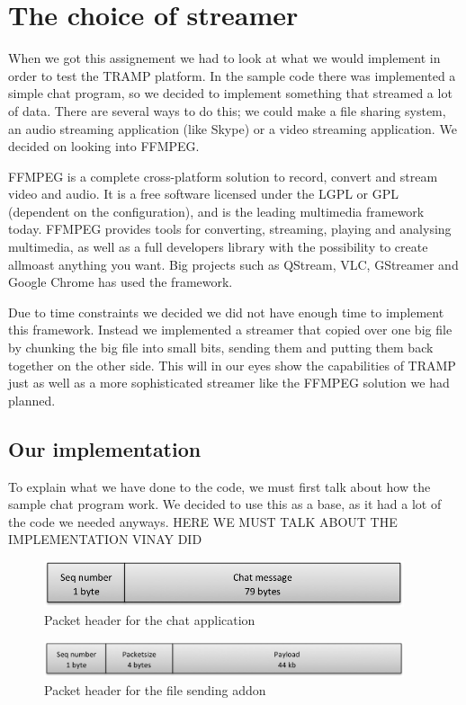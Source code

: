 
\section{The choice of streamer}
\label{sec:streamer}
When we got this assignement we had to look at what we would implement in order to test the TRAMP platform. In the sample code there was implemented a simple chat program, so we decided to implement something that streamed a lot of data. There are several ways to do this; we could make a file sharing system, an audio streaming application (like Skype) or a video streaming application. We decided on looking into FFMPEG.

FFMPEG is a complete cross-platform solution to record, convert and stream video and audio. It is a free software licensed under the LGPL or GPL (dependent on the configuration), and is the leading multimedia framework today.\cite{FFMPEG-homepage}
FFMPEG provides tools for converting, streaming, playing and analysing multimedia, as well as a full developers library with the possibility to create allmoast anything you want. Big projects such as QStream, VLC, GStreamer and Google Chrome has used the framework.

Due to time constraints we decided we did not have enough time to implement this framework. Instead we implemented a streamer that copied over one big file by chunking the big file into small bits, sending them and putting them back together on the other side. This will in our eyes show the capabilities of TRAMP just as well as a more sophisticated streamer like the FFMPEG solution we had planned.

\subsection{Our implementation}
To explain what we have done to the code, we must first talk about how the sample chat program work. We decided to use this as a base, as it had a lot of the code we needed anyways. HERE WE MUST TALK ABOUT THE IMPLEMENTATION VINAY DID

\begin{figure}[ht!]
\centering
 \includegraphics[width=300pt]{sendchatpkt.png}
\caption{Packet header for the chat application}
\label{Figure:Packet_header_chat}
\end{figure}


\begin{figure}[ht!]
\centering
 \includegraphics[width=300pt]{sendpkt.png}
\caption{Packet header for the file sending addon}
\end{figure}

